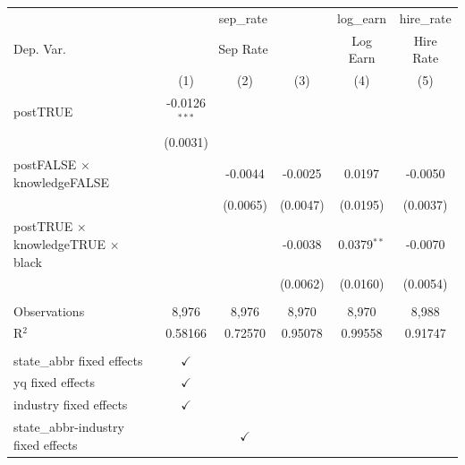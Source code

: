 
\begingroup
\centering
\begin{tabular}{lccccc}
   \toprule
    & \multicolumn{3}{c}{sep\_rate} & log\_earn & hire\_rate\\
   Dep. Var. & \multicolumn{3}{c}{Sep Rate} & Log Earn & Hire Rate \\ 
                                                    & (1)             & (2)           & (3)           & (4)           & (5)\\  
   \midrule 
   postTRUE                                         & -0.0126$^{***}$ &               &               &               &   \\   
                                                    & (0.0031)        &               &               &               &   \\   
   postFALSE $\times$ knowledgeFALSE                &                 & -0.0044       & -0.0025       & 0.0197        & -0.0050\\   
                                                    &                 & (0.0065)      & (0.0047)      & (0.0195)      & (0.0037)\\   
   postTRUE $\times$ knowledgeTRUE $\times$ black   &                 &               & -0.0038       & 0.0379$^{**}$ & -0.0070\\   
                                                    &                 &               & (0.0062)      & (0.0160)      & (0.0054)\\   
    \\
   Observations                                     & 8,976           & 8,976         & 8,970         & 8,970         & 8,988\\  
   R$^2$                                            & 0.58166         & 0.72570       & 0.95078       & 0.99558       & 0.91747\\  
    \\
   state\_abbr fixed effects                        & $\checkmark$    &               &               &               & \\  
   yq fixed effects                                 & $\checkmark$    &               &               &               & \\  
   industry fixed effects                           & $\checkmark$    &               &               &               & \\  
   state\_abbr-industry fixed effects               &                 & $\checkmark$  &               &               & \\  

\end{tabular}
